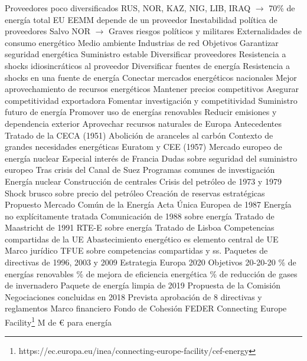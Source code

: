 \documentclass{nuevotema}
\begin{document}
\begin{esquemal}
			\3 Proveedores poco diversificados
				\4 RUS, NOR, KAZ, NIG, LIB, IRAQ
				\4[] $\to$ 70\% de energía total EU
				 EEMM depende de un proveedor
				\4 Inestabilidad política de proveedores
				\4[] Salvo NOR
				\4[] $\to$ Graves riesgos políticos y militares
			\3 Externalidades de consumo energético
				\4 Medio ambiente
				\4 Industrias de red
		\2 Objetivos
			\3 Garantizar seguridad energética
				\4 Suministro estable
			\3 Diversificar proveedores
				\4 Resistencia a shocks idiosincráticos al proveedor
			\3 Diversificar fuentes de energía
				\4 Resistencia a shocks en una fuente de energía
			\3 Conectar mercados energéticos nacionales
				\4 Mejor aprovechamiento de recursos energéticos
			\3 Mantener precios competitivos
				\4 Asegurar competitividad exportadora
			\3 Fomentar investigación y competitividad
				\4 Suministro futuro de energía
			\3 Promover uso de energías renovables
				\4 Reducir emisiones y dependencia exterior
				\4 Aprovechar recursos naturales de Europa
		\2 Antecedentes
			\3 Tratado de la CECA (1951)
				\4 Abolición de aranceles al carbón
				\4 Contexto de grandes necesidades energéticas
			\3 Euratom y CEE (1957)
				\4 Mercado europeo de energía nuclear
				\4[] Especial interés de Francia
				\4 Dudas sobre seguridad del suministro europeo
				\4[] Tras crisis del Canal de Suez
				\4 Programas comunes de investigación
				\4[] Energía nuclear
				\4[] Construcción de centrales
			\3 Crisis del petróleo de 1973 y 1979
				\4 Shock brusco sobre precio del petróleo
				\4 Creación de reservas estratégicas
				\4 Propuesto Mercado Común de la Energía
			\3 Acta Única Europea de 1987
				\4 Energía no explícitamente tratada
				\4 Comunicación de 1988 sobre energía
			\3 Tratado de Maastricht de 1991
				\4 RTE-E sobre energía
			\3 Tratado de Lisboa
				\4 Competencias compartidas de la UE
				\4 Abastecimiento energético es elemento central de UE
		\2 Marco jurídico
			\3 TFUE
				 sobre competencias compartidas
				 y ss.
			\3 Paquetes de directivas de 1996, 2003 y 2009
			\3 Estrategia Europa 2020
				\4 Objetivos 20-20-20
				\% de energías renovables
				\% de mejora de eficiencia energética
				\% de reducción de gases de invernadero
			\3 Paquete de energía limpia de 2019
				\4 Propuesta de la Comisión
				\4 Negociaciones concluidas en 2018
				\4 Prevista aprobación de 8 directivas y reglamentos
		\2 Marco financiero
			\3 Fondo de Cohesión
			\3 FEDER
			\3 Connecting Europe Facility\footnote{https://ec.europa.eu/inea/connecting-europe-facility/cef-energy}
				 M de € para energía

\end{esquemal}
\end{document}
